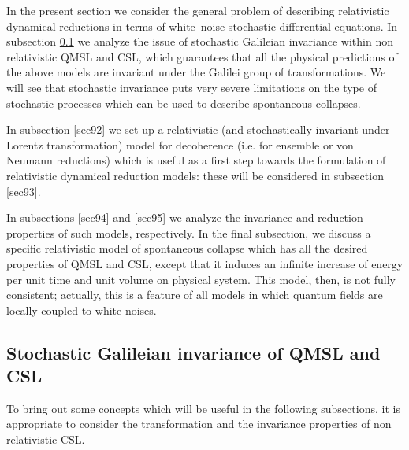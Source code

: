 \documentclass[12pt]{article}
\begin{document}
In the present section we consider the general problem of
describing relativistic dynamical reductions in terms of
white--noise stochastic differential equations. In subsection
\ref{sec91} we analyze the issue of stochastic Galileian
invariance within non relativistic QMSL and CSL, which guarantees
that all the physical predictions of the above models are
invariant under the Galilei group of transformations. We will see
that stochastic invariance puts very severe limitations on the
type of stochastic processes which can be used to describe
spontaneous collapses.

In subsection \ref{sec92} we set up a relativistic (and
stochastically invariant under Lorentz transformation) model for
decoherence (i.e. for ensemble or von Neumann reductions) which is
useful as a first step towards the formulation of relativistic
dynamical reduction models: these will be considered in subsection
\ref{sec93}.

In subsections \ref{sec94} and \ref{sec95} we analyze the
invariance and reduction properties of such models, respectively.
In the final subsection, we discuss a specific relativistic model
of spontaneous collapse which has all the desired properties of
QMSL and CSL, except that it induces an infinite increase of
energy per unit time and unit volume on physical system. This
model, then, is not fully consistent; actually, this is a feature
of all models in which quantum fields are locally coupled to white
noises.



\subsection{Stochastic Galileian invariance of QMSL and CSL}
\label{sec91}

To bring out some concepts which will be useful in the following
subsections, it is appropriate to consider the transformation and
the invariance properties of non relativistic CSL.
\end{document}

